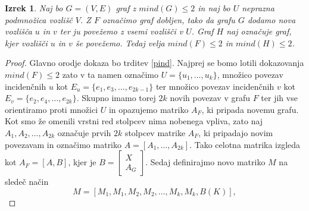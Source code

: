 \documentclass[12pt,a4paper,twoside]{article}
\theoremstyle{definition} %
\theoremstyle{plain} %
\newtheorem{izrek}[definicija]{Izrek}
\numberwithin{equation}{section}  %
\begin{document}
\begin{izrek}
\label{algcons}
Naj bo $G = (V, E)$ graf z $mind(G) \le 2$ in naj bo $U$ neprazna podmnožica vozlišč $V$. Z $F$ označimo graf dobljen, tako da grafu $G$ dodamo nova vozlišča $u$ in $v$ ter ju povežemo z vsemi vozlišči v $U$. Graf $H$ naj označuje graf, kjer vozlišči $u$ in $v$ še povežemo. Tedaj velja $mind(F) \le 2$ in $mind(H) \le 2$.
\end{izrek}

 \begin{proof}
Glavno orodje dokaza bo trditev \ref{pind}. Najprej se bomo lotili dokazovanja $mind(F) \le 2$ zato v ta namen označimo $U = \{u_1, \ldots, u_k\}$, množico povezav incidenčnih $u$ kot $E_u = \{e_1, e_3, \ldots, e_{2k - 1}\}$ ter množico povezav incidenčnih $v$ kot $E_v = \{e_2, e_4, \ldots,e_{2k}\}$. Skupno imamo torej $2k$ novih povezav v grafu $F$ ter jih vse orientiramo proti množici $U$ in opazujemo matriko $A_F$, ki pripada novemu grafu. Kot smo že omenili vrstni red stolpcev nima nobenega vpliva, zato naj $A_1, A_2, \ldots, A_{2k}$ označuje prvih $2k$ stolpcev matrike $A_F$, ki pripadajo novim povezavam in označimo matriko $A = [A_1, \ldots, A_{2k}]$. Tako celotna matrika izgleda kot $A_F =[A, B] $, kjer je $ B =\begin{bmatrix}X \\A_G \end{bmatrix}  $. Sedaj definirajmo novo matriko $M$ na sledeč način
$$ M = [M_1, M_1, M_2, M_2, \ldots, M_k, M_k, B(K)], $$

\end{proof}
\end{document}
